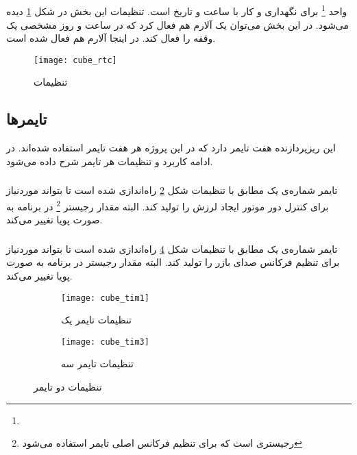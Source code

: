 \subsection{}
واحد
\footnote{}
برای نگهداری و کار با ساعت و تاریخ است. تنظیمات این بخش در شکل \ref{fig:cube-rtc} دیده می‌شود. در این بخش می‌توان یک آلارم هم فعال کرد که در ساعت و روز مشخصی یک وقفه را فعال کند. در اینجا آلارم هم فعال شده است.

	\begin{figure}[h]
		\centering
		\texttt{[image: cube\_rtc]}
		\caption{تنظیمات }
		\label{fig:cube-rtc}
	\end{figure}

\subsection{تایمرها}
این ریزپردازنده هفت تایمر دارد که در این پروژه هر هفت تایمر استفاده شده‌اند. در ادامه کاربرد و تنظیمات هر تایمر شرح داده می‌شود.

\subsubsection{}
تایمر شماره‌ی یک مطابق با تنظیمات شکل \ref{fig:cube-tim1} راه‌اندازی شده است تا بتواند  موردنیاز برای کنترل دور موتور ایجاد لرزش را تولید کند. البته مقدار رجیستر
\footnote{ رجیستری است که برای تنظیم فرکانس اصلی تایمر استفاده می‌شود}
در برنامه به صورت پویا تغییر می‌کند.

\subsubsection{}
تایمر شماره‌ی یک مطابق با تنظیمات شکل \ref{fig:cube-tim3} راه‌اندازی شده است تا بتواند  موردنیاز برای تنظیم فرکانس صدای بازر را تولید کند. البته مقدار رجیستر
در برنامه به صورت پویا تغییر می‌کند.

	\begin{figure}[h]
		\centering
		\begin{subfigure}{0.4\textwidth}
			\centering
			\texttt{[image: cube\_tim1]}
			\caption{تنظیمات تایمر یک}
			\label{fig:cube-tim1}
		\end{subfigure}
		\begin{subfigure}{0.44\textwidth}
			\centering
			\texttt{[image: cube\_tim3]}
			\caption{تنظیمات تایمر سه}
			\label{fig:cube-tim3}
		\end{subfigure}
		\caption{تنظیمات دو تایمر}
	\end{figure}

